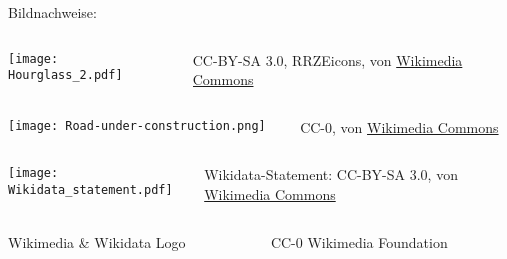 \documentclass{beamer}
\begin{document}
\begin{frame}{Bildnachweise:}

  \begin{columns}[c]
    \begin{column}[T]{20mm}
      \texttt{[image: Hourglass\_2.pdf]}
    \end{column}
    \begin{column}[T]{90mm}
      CC-BY-SA 3.0, RRZEicons, von \href{https://commons.wikimedia.org/wiki/File:Hourglass_2.svg}{Wikimedia Commons}
    \end{column}
  \end{columns}

\vspace{5mm}
  \begin{columns}[c]
    \begin{column}[T]{20mm}
      \texttt{[image: Road-under-construction.png]}
    \end{column}
    \begin{column}[T]{90mm}
      CC-0, von \href{https://commons.wikimedia.org/wiki/File:Road-under-construction.png}{Wikimedia Commons}
    \end{column}
  \end{columns}

\vspace{5mm}
  \begin{columns}[c]
    \begin{column}[T]{20mm}
      \texttt{[image: Wikidata\_statement.pdf]}
    \end{column}
    \begin{column}[T]{90mm}
      Wikidata-Statement: CC-BY-SA 3.0, von \href{https://commons.wikimedia.org/wiki/File:Wikidata_statement.svg}{Wikimedia Commons}
    \end{column}
  \end{columns}

\vspace{5mm}
  \begin{columns}[c]
    \begin{column}[T]{20mm}
      Wikimedia \& Wikidata Logo
    \end{column}
    \begin{column}[T]{90mm}
      CC-0 Wikimedia Foundation
    \end{column}
  \end{columns}

\end{frame}
\end{document}
